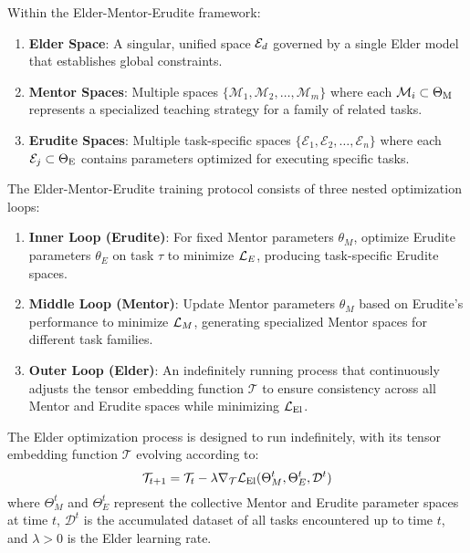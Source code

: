 \begin{definition}
Within the Elder-Mentor-Erudite framework:
\begin{enumerate}
    \item \textbf{Elder Space}: A singular, unified space $\mathcal{E}_{d}$ governed by a single Elder model that establishes global constraints.
    \item \textbf{Mentor Spaces}: Multiple spaces $\{\mathcal{M}_1, \mathcal{M}_2, \ldots, \mathcal{M}_m\}$ where each $\mathcal{M}_i \subset \Theta_{\text{M}}$ represents a specialized teaching strategy for a family of related tasks.
    \item \textbf{Erudite Spaces}: Multiple task-specific spaces $\{\mathcal{E}_1, \mathcal{E}_2, \ldots, \mathcal{E}_n\}$ where each $\mathcal{E}_j \subset \Theta_{\text{E}}$ contains parameters optimized for executing specific tasks.
\end{enumerate}
\end{definition}

\begin{definition}
The Elder-Mentor-Erudite training protocol consists of three nested optimization loops:
\begin{enumerate}
    \item \textbf{Inner Loop (Erudite)}: For fixed Mentor parameters $\theta_M$, optimize Erudite parameters $\theta_E$ on task $\tau$ to minimize $\mathcal{L}_E$, producing task-specific Erudite spaces.
    \item \textbf{Middle Loop (Mentor)}: Update Mentor parameters $\theta_M$ based on Erudite's performance to minimize $\mathcal{L}_M$, generating specialized Mentor spaces for different task families.
    \item \textbf{Outer Loop (Elder)}: An indefinitely running process that continuously adjusts the tensor embedding function $\mathcal{T}$ to ensure consistency across all Mentor and Erudite spaces while minimizing $\mathcal{L}_{\text{El}}$.
\end{enumerate}
\end{definition}

\begin{proposition}
The Elder optimization process is designed to run indefinitely, with its tensor embedding function $\mathcal{T}$ evolving according to:
\begin{equation}
\mathcal{T}_{t+1} = \mathcal{T}_t - \lambda \nabla_{\mathcal{T}} \mathcal{L}_{\text{El}}(\Theta_M^t, \Theta_E^t, \mathcal{D}^t)
\end{equation}
where $\Theta_M^t$ and $\Theta_E^t$ represent the collective Mentor and Erudite parameter spaces at time $t$, $\mathcal{D}^t$ is the accumulated dataset of all tasks encountered up to time $t$, and $\lambda > 0$ is the Elder learning rate.
\end{proposition}

